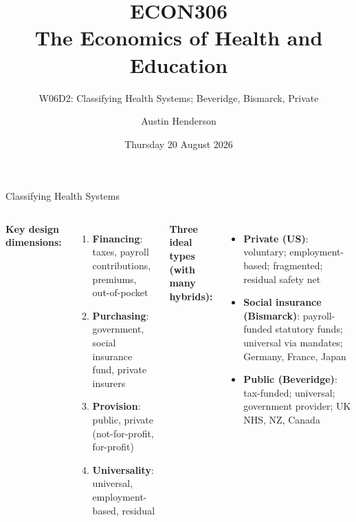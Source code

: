 \documentclass[aspectratio=169, 12pt]{beamer}
\title[ECON306: W06D2 — System Types \& Incentives]{ECON306\\The Economics of Health and Education}
\subtitle{W06D2: Classifying Health Systems; Beveridge, Bismarck, Private}
\author{Austin Henderson}
\institute{Department of Economics\\University of Otago}
\date{Thursday 20 August 2026}
\begin{document}
\begin{frame}[plain]
  \titlepage
\end{frame}



\begin{frame}{Classifying Health Systems}
  \begin{columns}
      \small\textbf{Key design dimensions:}
      \begin{enumerate}\small
        \item \textbf{Financing}: taxes, payroll contributions, premiums, out-of-pocket
        \item \textbf{Purchasing}: government, social insurance fund, private insurers
        \item \textbf{Provision}: public, private (not-for-profit, for-profit)
        \item \textbf{Universality}: universal, employment-based, residual
      \end{enumerate}
      \small\textbf{Three ideal types (with many hybrids):}
      \begin{itemize}\footnotesize
        \item \textbf{Private (US)}: voluntary; employment-based; fragmented; residual safety net
        \item \textbf{Social insurance (Bismarck)}: payroll-funded statutory funds; universal via mandates; Germany, France, Japan
        \item \textbf{Public (Beveridge)}: tax-funded; universal; government provider; UK NHS, NZ, Canada
      \end{itemize}
  \end{columns}
\end{frame}
\end{document}
